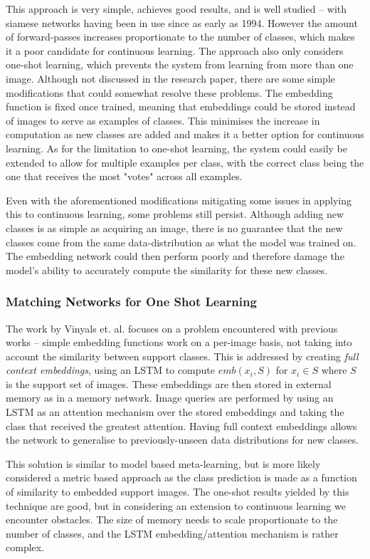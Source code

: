 \documentclass{report}
\begin{document}
	This approach is very simple, achieves good results, and is well studied -- with siamese networks having been in use since as early as 1994. However the amount of forward-passes increases proportionate to the number of classes, which makes it a poor candidate for continuous learning. The approach also only considers one-shot learning, which prevents the system from learning from more than one image. Although not discussed in the research paper, there are some simple modifications that could somewhat resolve these problems. The embedding function is fixed once trained, meaning that embeddings could be stored instead of images to serve as examples of classes. This minimises the increase in computation as new classes are added and makes it a better option for continuous learning. As for the limitation to one-shot learning, the system could easily be extended to allow for multiple examples per class, with the correct class being the one that receives the most "votes" across all examples. \par
	Even with the aforementioned modifications mitigating some issues in applying this to continuous learning, some problems still persist. Although adding new classes is as simple as acquiring an image, there is no guarantee that the new classes come from the same data-distribution as what the model was trained on. The embedding network could then perform poorly and therefore damage the model's ability to accurately compute the similarity for these new classes. \par
	
	\subsubsection{Matching Networks for One Shot Learning}
	The work by Vinyals et. al. \parencite{matching} focuses on a problem encountered with previous works -- simple embedding functions work on a per-image basis, not taking into account the similarity between support classes. This is addressed by creating \emph{full context embeddings}, using an LSTM to compute $emb(x_i,S)$ for $x_i \in S$ where $S$ is the support set of images. These embeddings are then stored in external memory as in a memory network. Image queries are performed by using an LSTM as an attention mechanism over the stored embeddings and taking the class that received the greatest attention. Having full context embeddings allows the network to generalise to previously-unseen data distributions for new classes. \par
	This solution is similar to model based meta-learning, but is more likely considered a metric based approach as the class prediction is made as a function of similarity to embedded support images. The one-shot results yielded by this technique are good, but in considering an extension to continuous learning we encounter obstacles. The size of memory needs to scale proportionate to the number of classes, and the LSTM embedding/attention mechanism is rather complex. \par
\end{document}
